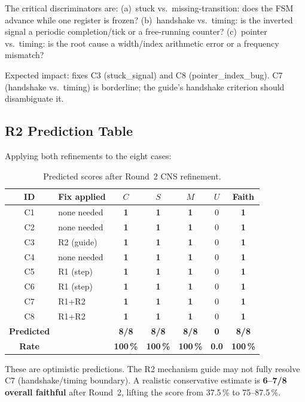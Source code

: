 \documentclass[11pt,a4paper]{article}
\newcommand{\yes}{\textcolor{killgreen}{\textbf{1}}}
\begin{document}
\noindent The critical discriminators are: (a)~stuck vs.\ missing-transition:
does the FSM advance while one register is frozen? (b)~handshake vs.\
timing: is the inverted signal a periodic completion/tick or a free-running
counter? (c)~pointer vs.\ timing: is the root cause a width/index arithmetic
error or a frequency mismatch?

Expected impact: fixes C3 (stuck\_signal) and C8 (pointer\_index\_bug).
C7 (handshake vs.\ timing) is borderline; the guide's handshake criterion
should disambiguate it.

\subsection{R2 Prediction Table}

Applying both refinements to the eight cases:

\begin{table}[H]
\centering
\caption{Predicted scores after Round~2 CNS refinement.}
\label{tab:r2_predicted}
\begin{tabular}{clccccc}
\toprule
\textbf{ID} & \textbf{Fix applied} & $C$ & $S$ & $M$ & $U$ &
  \textbf{Faith} \\
\midrule
C1 & none needed    & \yes & \yes & \yes & 0 & \yes \\
C2 & none needed    & \yes & \yes & \yes & 0 & \yes \\
C3 & R2 (guide)     & \yes & \yes & \yes & 0 & \yes \\
C4 & none needed    & \yes & \yes & \yes & 0 & \yes \\
C5 & R1 (step)      & \yes & \yes & \yes & 0 & \yes \\
C6 & R1 (step)      & \yes & \yes & \yes & 0 & \yes \\
C7 & R1+R2          & \yes & \yes & \yes & 0 & \yes \\
C8 & R1+R2          & \yes & \yes & \yes & 0 & \yes \\
\midrule
\textbf{Predicted} & & \textbf{8/8} & \textbf{8/8} & \textbf{8/8} &
  \textbf{0} & \textbf{8/8} \\
\textbf{Rate} & & \textbf{100\,\%} & \textbf{100\,\%} & \textbf{100\,\%} &
  \textbf{0.0} & \textbf{100\,\%} \\
\bottomrule
\end{tabular}
\end{table}

\noindent These are optimistic predictions. The R2 mechanism guide may not fully
resolve C7 (handshake/timing boundary). A realistic conservative estimate is
\textbf{6--7/8 overall faithful} after Round~2, lifting the score from 37.5\,\%
to 75--87.5\,\%.
\end{document}

